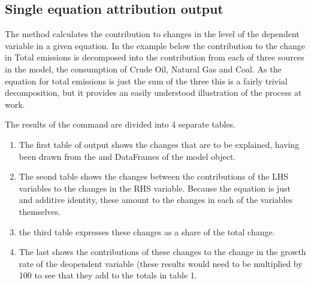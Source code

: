 \documentclass[letterpaper,10pt,english]{jupyterBook}
\begin{document}
\subsection{Single equation attribution output}
\label{\detokenize{content/06_ModelAnalytics/Attribution:single-equation-attribution-output}}
\sphinxAtStartPar
The  method calculates the contribution to changes in the level of the dependent variable in a given equation.  In the example below the contribution to the change in Total emissions is decomposed into the contribution from each of three sources in the model, the consumption of Crude Oil, Natural Gas and Coal.  As the equation for total emissions is just the sum of the three this is a fairly trivial decomposition, but it provides an easily understood illustration of the process at work.

\sphinxAtStartPar
The results of the  command are divided into 4 separate tables.
\begin{enumerate}
%
\item {} 
\sphinxAtStartPar
The first table of output shows the changes that are to be explained, having been drawn from the  and  DataFrames of the model object.

\item {} 
\sphinxAtStartPar
The seond table shows the changes between the contributions of the LHS variables to the changes in the RHS variable.  Because the equation is just and additive identity, these amount to the changes in each of the variables themselves.

\item {} 
\sphinxAtStartPar
the third table expresses these changes as a share of the total change.

\item {} 
\sphinxAtStartPar
The last shows the contributions of these changes to the change in the growth rate of the deopendent variable (these results would need to be multiplied by 100 to see that they add to the totals in table 1.

\end{enumerate}
\end{document}
